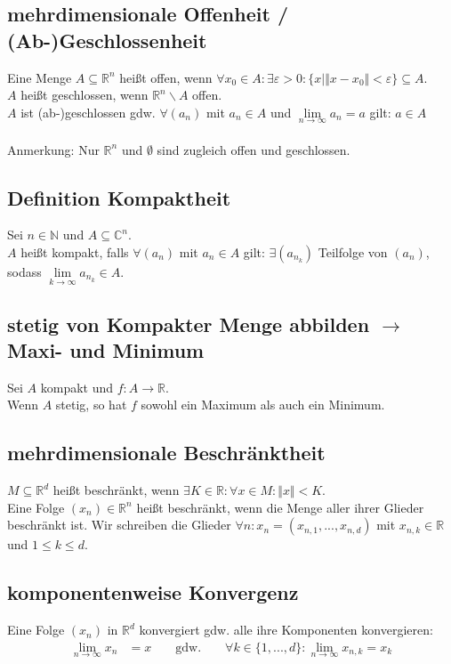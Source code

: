 \documentclass[halfparscip]{scrartcl}
\newcounter{subsection2}
\begin{document}
\subsection*{mehrdimensionale Offenheit / (Ab-)Geschlossenheit}
Eine Menge $A \subseteq \mathbb{R}^n$ heißt offen, wenn $\forall x_0 \in A: \exists \varepsilon > 0 : \{x \mid \Vert x-x_0\Vert < \varepsilon\} \subseteq A$.\\
$A$ heißt geschlossen, wenn $\mathbb{R}^n \backslash A$ offen.\\
$A$ ist (ab-)geschlossen gdw. $\forall (a_n)$ mit $a_n \in A$ und $\lim\limits_{n \rightarrow \infty} a_n = a$ gilt: $a \in A$\\\\
Anmerkung: Nur $\mathbb{R}^n$ und $\emptyset$ sind zugleich offen und geschlossen.

\subsection{Definition Kompaktheit}
Sei $n \in \mathbb{N}$ und $A \subseteq \mathbb{C}^n$.\\
$A$ heißt kompakt, falls $\forall (a_n)$ mit $a_n \in A$ gilt: $\exists (a_{n_k})$ Teilfolge von $(a_n)$, sodass \mbox{$\lim\limits_{k \rightarrow \infty} a_{n_k}\in{}A$}.

\subsection{stetig von Kompakter Menge abbilden $\rightarrow$ Maxi- und Minimum}
Sei $A$ kompakt und $f : A \rightarrow \mathbb{R}$.\\
Wenn $A$ stetig, so hat $f$ sowohl ein Maximum als auch ein Minimum.

\subsection{mehrdimensionale Beschränktheit}
$M \subseteq \mathbb{R}^d$ heißt beschränkt, wenn $\exists K \in \mathbb{R} : \forall x \in M : \Vert x\Vert < K$.\\
Eine Folge $(x_n) \in \mathbb{R}^n$ heißt beschränkt, wenn die Menge aller ihrer Glieder beschränkt ist. Wir schreiben die Glieder $\forall n: x_n = (x_{n,1},...,x_{n,d})$ mit $x_{n,k} \in \mathbb{R}$ und $1 \leq k \leq d$.

\subsection{komponentenweise Konvergenz}
Eine Folge $(x_n)$ in $\mathbb{R}^d$ konvergiert gdw. alle ihre Komponenten konvergieren:
\begin{align*}
	\lim_{n \rightarrow \infty} x_n &= x &  & \text{ gdw. } &  &\forall k \in \{1,...,d\}: \lim_{n \rightarrow \infty} x_{n,k} = x_k
\end{align*}
\end{document}
